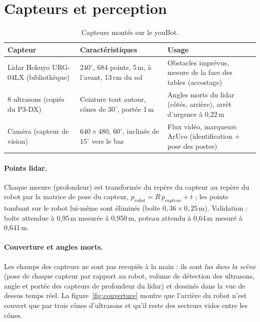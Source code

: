 \documentclass[11pt,a4paper]{article}
\begin{document}
\section{Capteurs et perception}

\begin{table}[h]
\centering\small
\begin{tabularx}{\linewidth}{@{}lLL@{}}
\toprule
\textbf{Capteur} & \textbf{Caractéristiques} & \textbf{Usage} \\
\midrule
Lidar Hokuyo URG-04LX (bibliothèque) & $240^\circ$, 684 points, 5\,m, à l'avant, 13\,cm du sol &
  Obstacles imprévus, mesure de la face des tables (accostage) \\
8 ultrasons (copiés du P3-DX) & Ceinture tout autour, cônes de $30^\circ$, portée 1\,m &
  Angles morts du lidar (côtés, arrière), arrêt d'urgence à 0,22\,m \\
Caméra (capteur de vision) & $640\times480$, $60^\circ$, inclinée de $15^\circ$ vers le bas &
  Flux vidéo, marqueurs ArUco (identification + pose des postes) \\
\bottomrule
\end{tabularx}
\caption{Capteurs montés sur le youBot.}
\end{table}

\paragraph{Points lidar.} Chaque mesure (profondeur) est transformée du repère du capteur au repère
du robot par la matrice de pose du capteur, $p_{robot} = R\,p_{capteur} + t$ ; les points tombant
sur le robot lui-même sont éliminés (boîte $0{,}36\times0{,}25$\,m). Validation : boîte attendue à
0,95\,m mesurée à 0,950\,m, poteau attendu à 0,64\,m mesuré à 0,641\,m.

\paragraph{Couverture et angles morts.} Les champs des capteurs ne sont pas recopiés à la main : ils
sont \emph{lus dans la scène} (pose de chaque capteur par rapport au robot, volume de détection des
ultrasons, angle et portée des capteurs de profondeur du lidar) et dessinés dans la vue de dessus
temps réel. La figure~\ref{fig:couverture} montre que l'arrière du robot n'est couvert que par trois
cônes d'ultrasons et qu'il reste des secteurs vides entre les cônes.
\end{document}
